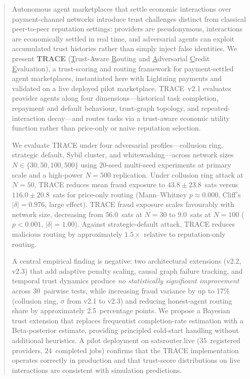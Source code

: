 \documentclass[sigconf,nonacm,10pt]{acmart}
\begin{document}
\begin{abstract}
Autonomous agent marketplaces that settle economic interactions
over payment-channel networks introduce trust challenges distinct
from classical peer-to-peer reputation settings: providers are
pseudonymous, interactions are economically settled in real time,
and adversarial agents can exploit accumulated trust histories
rather than simply inject false identities. We present
\textbf{TRACE} (\underline{T}rust-Aware \underline{R}outing and
\underline{A}dversarial \underline{C}redit \underline{E}valuation),
a trust-scoring and routing framework for payment-settled agent
marketplaces, instantiated here with Lightning payments and validated
on a live deployed pilot marketplace. TRACE~v2.1 evaluates
provider agents along four dimensions---historical task completion,
repayment and default behaviour, trust-graph topology, and
repeated-interaction decay---and routes tasks via a trust-aware
economic utility function rather than price-only or naive
reputation selection.

We evaluate TRACE under four adversarial profiles---collusion ring,
strategic default, Sybil cluster, and whitewashing---across network
sizes $N \in \{30, 50, 100, 500\}$ using 20-seed multi-seed
experiments at primary scale and a high-power $N{=}500$ replication.
Under collusion ring attack at $N{=}50$, TRACE reduces mean fraud
exposure to $43.8 \pm 23.8$~sats versus $116.0 \pm 20.8$~sats for
price-only routing (Mann--Whitney $p \approx 0.000$, Cliff's
$|\delta| = 0.976$, large effect). TRACE fraud exposure scales
favourably with network size, decreasing from $56.0$~sats at
$N{=}30$ to $9.0$~sats at $N{=}100$ ($p < 0.001$,
$|\delta| = 1.00$). Against strategic-default attack, TRACE reduces
malicious routing by approximately $1.5\times$ relative to
reputation-only routing.

A central empirical finding is negative: two architectural
extensions (v2.2, v2.3) that add adaptive penalty scaling, causal
graph failure tracking, and temporal trust dynamics produce
\emph{no statistically significant improvement} across 30~pairwise
tests, while increasing fraud variance by up to 17\% (collusion
ring, $\sigma$ from v2.1 to v2.3) and reducing honest-agent routing
share by approximately 2.5~percentage points. We propose a Bayesian
trust extension that replaces frequentist completion-rate estimation
with a Beta-posterior estimate, providing principled cold-start
handling without additional heuristics. A pilot deployment on
satsrouter.live ($35$~registered providers, $24$~completed jobs)
confirms that the TRACE implementation operates correctly in
production and that trust-score distributions on live interactions
are consistent with simulation predictions.
\end{abstract}
\end{document}
